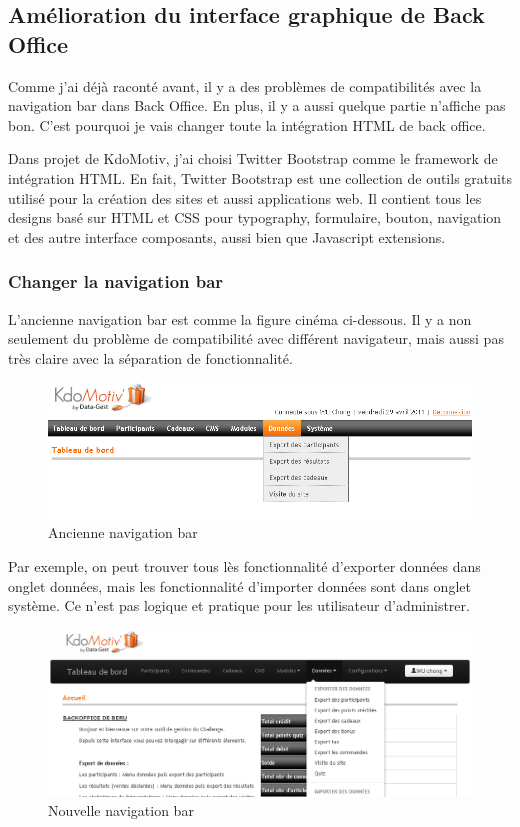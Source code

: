 \newpage

\subsection{Amélioration du interface graphique de Back Office}
Comme j'ai déjà raconté avant, il y a des problèmes de compatibilités avec la navigation bar dans Back Office. En plus, il y a aussi quelque partie n'affiche pas bon. C'est pourquoi je vais changer toute la intégration HTML de back office.

Dans projet de KdoMotiv, j'ai choisi Twitter Bootstrap comme le framework de intégration HTML. En fait, Twitter Bootstrap est une collection de outils gratuits utilisé pour la création des sites et aussi applications web. Il contient tous les designs basé sur HTML et CSS pour typography, formulaire, bouton, navigation et des autre interface composants, aussi bien que Javascript extensions.

\subsubsection{Changer la navigation bar}
L'ancienne navigation bar est comme la figure cinéma ci-dessous. Il y a non seulement du problème de compatibilité avec différent navigateur, mais aussi pas très claire avec la séparation de fonctionnalité.
\begin{figure}[hbtp]
\centering
\includegraphics[width=15cm]{body/images/navbar-old.png}
\caption{Ancienne navigation bar}
\end{figure}

Par exemple, on peut trouver tous lès fonctionnalité d'exporter données dans onglet données, mais les fonctionnalité d'importer données sont dans onglet système. Ce n'est pas logique et pratique pour les utilisateur d'administrer.



 \begin{figure}[hbtp]
\centering
\includegraphics[width=15cm]{body/images/navbar-new.png}
\caption{Nouvelle navigation bar}
\end{figure}

